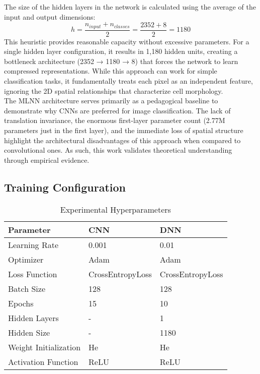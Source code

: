 \documentclass[runningheads]{llncs}
\begin{document}
\noindent
The size of the hidden layers in the network is calculated using the average of the input and output dimensions:
\begin{equation}
h = \frac{n_{input} + n_{classes}}{2} = \frac{2352 + 8}{2} = 1180
\end{equation}
This heuristic provides reasonable capacity without excessive parameters. 
For a single hidden layer configuration, it results in 1,180 hidden units, creating a bottleneck architecture (2352 → 1180 → 8) that forces the network to learn compressed representations. 
While this approach can work for simple classification tasks, it fundamentally treats each pixel as an independent feature, ignoring the 2D spatial relationships that characterize cell morphology. \\
\noindent
The MLNN architecture serves primarily as a pedagogical baseline to demonstrate why CNNs are preferred for image classification. 
The lack of translation invariance, the enormous first-layer parameter count (2.77M parameters just in the first layer), and the immediate loss of spatial structure highlight the architectural disadvantages of this approach when compared to convolutional ones. 
As such, this work validates theoretical understanding through empirical evidence.

\subsection{Training Configuration}

\begin{table}[htbp]
\centering
\caption{Experimental Hyperparameters}
\label{tab:hyperparameters}
\begin{tabular}{lll}
\toprule
\textbf{Parameter} & \textbf{CNN} & \textbf{DNN} \\
\midrule
Learning Rate & 0.001 & 0.01 \\
Optimizer & Adam & Adam \\
Loss Function & CrossEntropyLoss & CrossEntropyLoss \\
Batch Size & 128 & 128 \\
Epochs & 15 & 10 \\
Hidden Layers & - & 1 \\
Hidden Size & - & 1180 \\
Weight Initialization & He & He \\
Activation Function & ReLU & ReLU \\
\bottomrule
\end{tabular}
\end{table}
\end{document}
